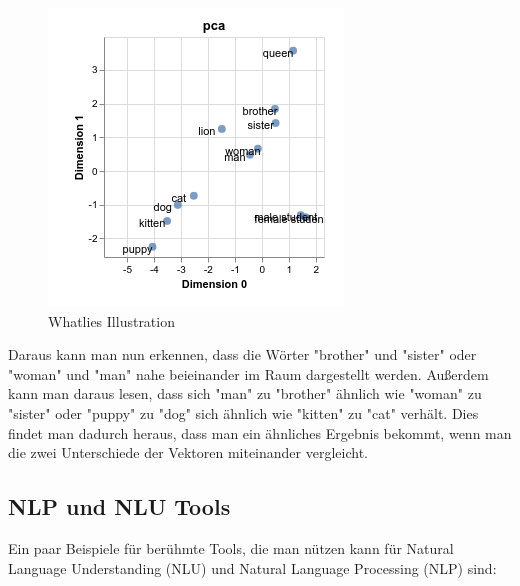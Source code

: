 \begin{figure}[hbt!]
    \centering
    \includegraphics[scale=0.50]{pics/whatlies_demo}
    \caption{Whatlies Illustration~\cite{whatlies}}
    \label{fig:whatlies-demo}
\end{figure}

Daraus kann man nun erkennen, dass die Wörter "brother" und "sister" oder "woman" und "man" nahe beieinander im Raum dargestellt werden.
Außerdem kann man daraus lesen, dass sich "man" zu "brother" ähnlich wie "woman" zu "sister" oder "puppy" zu "dog" sich ähnlich wie "kitten" zu "cat" verhält.
Dies findet man dadurch heraus, dass man ein ähnliches Ergebnis bekommt, wenn man die zwei Unterschiede der Vektoren miteinander vergleicht.

\subsection{NLP und NLU Tools}

Ein paar Beispiele für berühmte Tools, die man nützen kann für Natural Language Understanding (NLU) und Natural Language Processing (NLP) sind:

